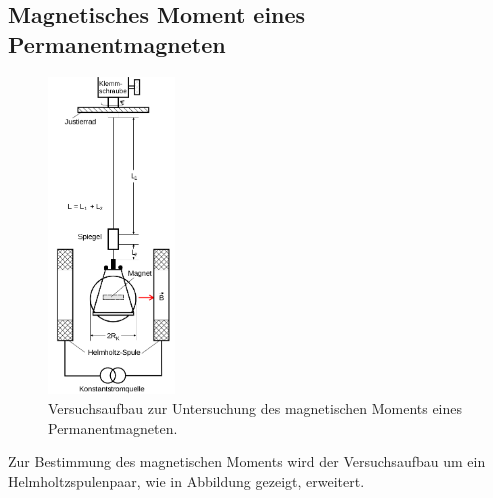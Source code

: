 \FloatBarrier
\subsection{Magnetisches Moment eines Permanentmagneten}

\begin{figure}
	\centering
	\includegraphics[width=0.3\textwidth]{Bilder/helmholtz.png}
	\caption{Versuchsaufbau zur Untersuchung des magnetischen Moments eines Permanentmagneten. \cite{Anleitung}}
	\label{fig:helmholtz}
\end{figure}
Zur Bestimmung des magnetischen Moments wird der Versuchsaufbau um ein Helmholtzspulenpaar, wie in Abbildung  gezeigt, erweitert.
